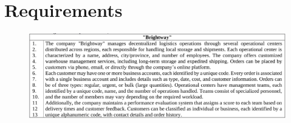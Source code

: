 \chapter{Requirements}

\begin{figure}[H]
    \centering
    \includegraphics[width=1.0\textwidth]{img/requirements.png}
\end{figure}